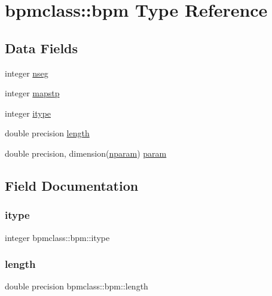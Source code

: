 \hypertarget{structbpmclass_1_1bpm}{}\section{bpmclass\+::bpm Type Reference}
\label{structbpmclass_1_1bpm}
\subsection*{Data Fields}
\begin{DoxyCompactItemize}
\item 
integer \mbox{\hyperlink{structbpmclass_1_1bpm_af47828f23a39ecfbef81048d780c4107}{nseg}}
\item 
integer \mbox{\hyperlink{structbpmclass_1_1bpm_a57b5d567476a69c20de780f6fb8d0a2e}{mapstp}}
\item 
integer \mbox{\hyperlink{structbpmclass_1_1bpm_a8759ea53c8b66bbdb08055405fff79a0}{itype}}
\item 
double precision \mbox{\hyperlink{structbpmclass_1_1bpm_a91bf471e42c1c733f27253fe367c02e1}{length}}
\item 
double precision, dimension(\mbox{\hyperlink{namespacebpmclass_ac2f2f373976236d08c9c68de895950eb}{nparam}}) \mbox{\hyperlink{structbpmclass_1_1bpm_ab4cbff356dd68d8a0563cb3b1d4ae235}{param}}
\end{DoxyCompactItemize}


\subsection{Field Documentation}
\mbox{\label{structbpmclass_1_1bpm_a8759ea53c8b66bbdb08055405fff79a0}} 
\subsubsection{\texorpdfstring{itype}{itype}}
{\footnotesize\ttfamily integer bpmclass\+::bpm\+::itype}

\mbox{\label{structbpmclass_1_1bpm_a91bf471e42c1c733f27253fe367c02e1}} 
\subsubsection{\texorpdfstring{length}{length}}
{\footnotesize\ttfamily double precision bpmclass\+::bpm\+::length}

